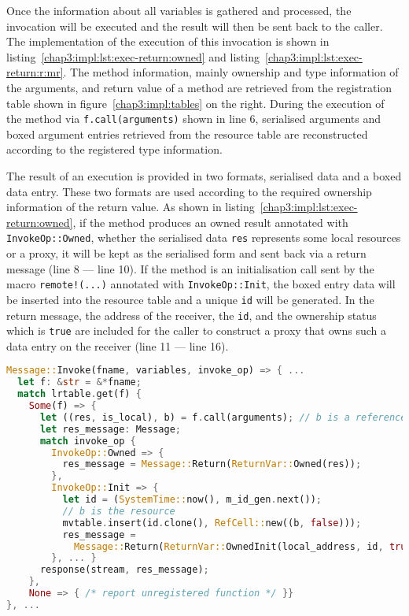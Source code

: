 Once the information about all variables is gathered and processed, the invocation will be executed and the result will then be sent back to the caller. The implementation of the execution of this invocation is shown in listing~\ref{chap3:impl:lst:exec-return:owned} and listing~\ref{chap3:impl:lst:exec-return:r:mr}. The method information, mainly ownership and type information of the arguments, and return value of a method are retrieved from the registration table shown in figure~\ref{chap3:impl:tables} on the right. During the execution of the method via \lstinline{f.call(arguments)} shown in line 6, serialised arguments and boxed argument entries retrieved from the resource table are reconstructed according to the registered type information.

The result of an execution is provided in two formats, serialised data and a boxed data entry. These two formats are used according to the required ownership information of the return value. 
As shown in listing~\ref{chap3:impl:lst:exec-return:owned}, if the method produces an owned result annotated with \lstinline{InvokeOp::Owned}, whether the serialised data \lstinline{res} represents some local resources or a proxy, it will be kept as the serialised form and sent back via a return message (line 8 --- line 10). If the method is an initialisation call sent by the macro \lstinline{remote!(...)} annotated with \lstinline{InvokeOp::Init}, the boxed entry data will be inserted into the resource table and a unique \lstinline{id} will be generated. In the return message, the address of the receiver, the \lstinline{id}, and the ownership status which is \lstinline{true} are included for the caller to construct a proxy that owns such a data entry on the receiver (line 11 --- line 16).
\begin{lstlisting}[language=Rust, style=boxed, basicstyle=\footnotesize\ttfamily, caption={Executing an invocation and returning the result: \lstinline{Owned} and \lstinline{Init}}, label=chap3:impl:lst:exec-return:owned]
Message::Invoke(fname, variables, invoke_op) => { ...
  let f: &str = &*fname; 
  match lrtable.get(f) {
    Some(f) => {
      let ((res, is_local), b) = f.call(arguments); // b is a reference
      let res_message: Message;
      match invoke_op {
        InvokeOp::Owned => { 
          res_message = Message::Return(ReturnVar::Owned(res)); 
        },
        InvokeOp::Init => {
          let id = (SystemTime::now(), m_id_gen.next());
          // b is the resource
          mvtable.insert(id.clone(), RefCell::new((b, false)));
          res_message = 
            Message::Return(ReturnVar::OwnedInit(local_address, id, true));
        }, ... }
      response(stream, res_message);
    },
    None => { /* report unregistered function */ }}
}, ...
\end{lstlisting}

